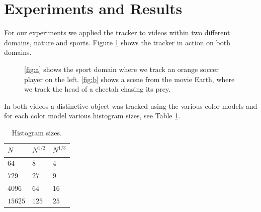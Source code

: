 \documentclass[11pt]{article}
\begin{document}
\section{Experiments and Results}
For our experiments we applied the tracker to videos within two different
domains, nature and sports. Figure \ref{fig:videos} shows the tracker in action
on both domains. 
\begin{figure}[!ht]
\centering
{}
\caption{\ref{fig:a} shows the sport domain where we track an orange soccer
player on the left. \ref{fig:b} shows a scene from the movie Earth, where we
track the head of a cheetah chasing its prey.}
\label{fig:videos}
\end{figure}
In both videos a distinctive object was tracked using the various color models
and for each color model various histogram sizes, see Table \ref{table:bins}.
\begin{table}[!ht]
\centering
\begin{tabular}{l|l|l}
$N$     & $N^{1/2}$ & $N^{1/3}$\\\hline
$64$    & $8$       & $4$\\\hline
$729$   & $27$      & $9$\\\hline
$4096$  & $64$      & $16$\\\hline
$15625$ & $125$     & $25$\\
\end{tabular}
\caption{Histogram sizes.}
\label{table:bins}
\end{table}
\end{document}
